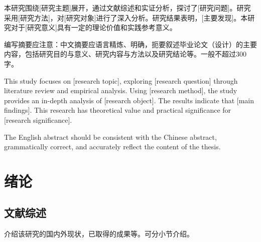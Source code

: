 \documentclass[numbering=arabic,fontset=auto]{jnuthesis}
\begin{document}

\makeblankcover

\makestatement

\begin{zhabstract}

本研究围绕[研究主题]展开，通过文献综述和实证分析，探讨了[研究问题]。研究采用[研究方法]，对[研究对象]进行了深入分析。研究结果表明，[主要发现]。本研究对于[研究意义]具有一定的理论价值和实践参考意义。

编写摘要应注意：中文摘要应语言精炼、明确，扼要叙述毕业论文（设计）的主要内容，包括研究目的与意义、研究内容与方法以及研究结论等。一般不超过300字。

\end{zhabstract}

\begin{enabstract}

This study focuses on [research topic], exploring [research question] through literature review and empirical analysis. Using [research method], the study provides an in-depth analysis of [research object]. The results indicate that [main findings]. This research has theoretical value and practical significance for [research significance].

The English abstract should be consistent with the Chinese abstract, grammatically correct, and accurately reflect the content of the thesis.

\end{enabstract}

\tableofcontents


\chapter{绪论}

\section{文献综述}

介绍该研究的国内外现状，已取得的成果等。可分小节介绍。
\end{document}
